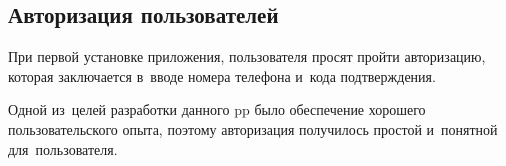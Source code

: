 \subsection{Авторизация пользователей}
\label{sec:usage:auth}

При первой установке приложения, пользователя просят пройти авторизацию, которая заключается в~вводе номера телефона и~кода подтверждения.




Одной из~целей разработки данного \gls{pp} было обеспечение хорошего пользовательского опыта, поэтому авторизация получилось простой и~понятной для~пользователя.